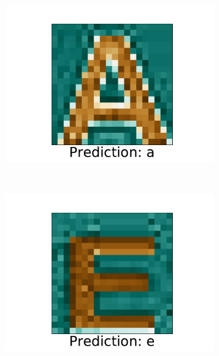 \documentclass[../main.tex]{subfiles}
\begin{document}
\begin{figure}
\begin{subfigure}[t]{0.15\textwidth}
        \includegraphics[width=\textwidth]{figures/ex/p_2.pdf}
        \label{fig:gull}
    \end{subfigure}
    ~ 
    \begin{subfigure}[t]{0.15\textwidth}
        \includegraphics[width=\textwidth]{figures/ex/p_3.pdf}
        \label{fig:gull}
    \end{subfigure}
    ~ 
    \begin{subfigure}[t]{0.15\textwidth}

\end{subfigure}
\end{figure}
\end{document}
